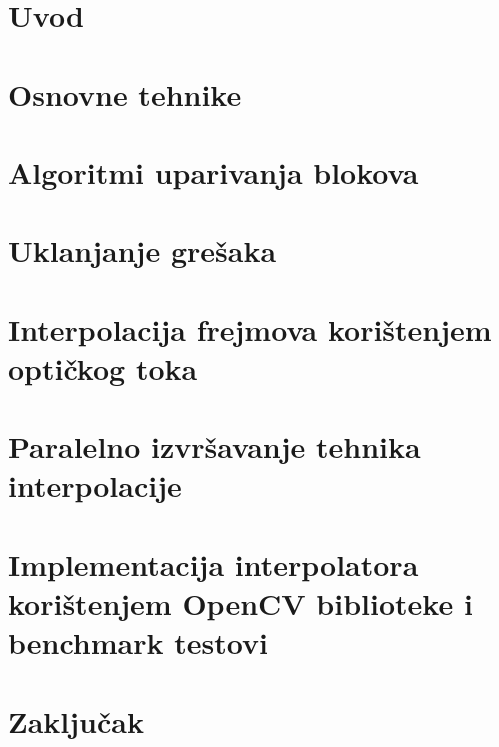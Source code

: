 \documentclass[12pt]{report}
\newcommand{\ch}{\v{c}}
\newcommand{\sh}{\v{s}}
\begin{document}
\tableofcontents

\chapter{Uvod}


\chapter{Osnovne tehnike}


\chapter{Algoritmi uparivanja blokova}


\chapter{Uklanjanje gre\sh aka}


\chapter{Interpolacija frejmova kori\sh tenjem opti\ch kog toka}

\chapter{Paralelno izvr\sh avanje tehnika interpolacije}

\chapter{Implementacija interpolatora kori\sh tenjem OpenCV biblioteke i benchmark testovi}

\chapter{Zaklju\ch ak}
\end{document}
